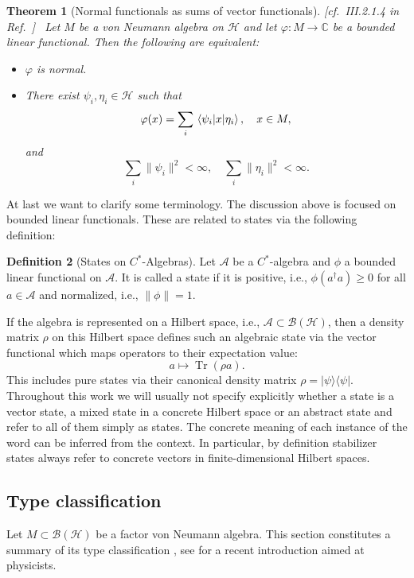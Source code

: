 \documentclass[aps,pra,reprint,superscriptaddress]{revtex4-2}
\newcommand{\cA}{{\mathcal A}}
\newcommand{\cB}{{\mathcal B}}
\newcommand{\cH}{{\mathcal H}}
\renewcommand\r{\rho}
\providecommand{\Tr}{\operatorname{Tr}}
\providecommand{\norm}[1]{\lVert #1\rVert}
\newcommand{\thmref}[1]{\textnormal{[#1]}\ }
\newtheorem{theorem}{Theorem}
\theoremstyle{definition}
\newtheorem{definition}[theorem]{Definition}
\theoremstyle{remark}
\begin{document}
\begin{theorem}[Normal functionals as sums of vector functionals]\label{thm:blackadar-normal-vector}
\thmref{cf.~III.2.1.4 in Ref.~\cite{Blackadar}}
Let $M$ be a von Neumann algebra on $\cH$ and let
$\varphi:M \rightarrow \mathbb{C}$ be a bounded linear functional. Then the
following are equivalent:
\begin{itemize}
    \item[(i)] $\varphi$ is normal.
    \item[(ii)] There exist $\psi_i,\eta_i \in \cH$ such that
    \begin{equation}
        \varphi(x) = \sum_i \mel{\psi_i}{x}{\eta_i},
        \quad x \in M,
    \end{equation}
    and
    \begin{equation}
        \sum_i \norm{\psi_i}^2 < \infty,
        \quad
        \sum_i \norm{\eta_i}^2 < \infty.
    \end{equation}
\end{itemize}
\end{theorem}
At last we want to clarify some terminology. The discussion above is focused on bounded linear functionals. These are related to states via the following definition: 

\begin{definition}[States on $C^\ast$-Algebras] Let $\cA$ be a $C^\ast$-algebra and $\phi$ a bounded linear functional on $\cA$. It is called a state if it is positive, i.e., $\phi(a^\dagger a) \geq 0$ for all $a \in \cA$ and normalized, i.e., $\norm{\phi} = 1$.
\end{definition}
If the algebra is represented on a Hilbert space, i.e., $\cA \subset \cB(\cH)$, then a density matrix $\r$ on this Hilbert space defines such an algebraic state via the vector functional which maps operators to their expectation value:
\begin{equation}
    a \mapsto \Tr(\r a).
\end{equation}
This includes pure states via their canonical density matrix $\r = \lvert\psi\rangle\langle\psi\rvert$. Throughout this work we will
usually not specify explicitly whether a state is a vector state, a mixed state in a concrete Hilbert space or an abstract state and refer to all of them simply as states. The concrete meaning of each instance of the word can be inferred from the context. In particular, by definition stabilizer states always refer to concrete vectors in finite-dimensional Hilbert spaces.

\subsection{Type classification}\label{app:type-recap}
Let $M\subset\cB(\cH)$ be a factor von Neumann algebra. This section
constitutes a summary of its type classification \cite{Blackadar}, see
\cite{Sorce:2023fdx} for a recent introduction aimed at physicists.
\end{document}
